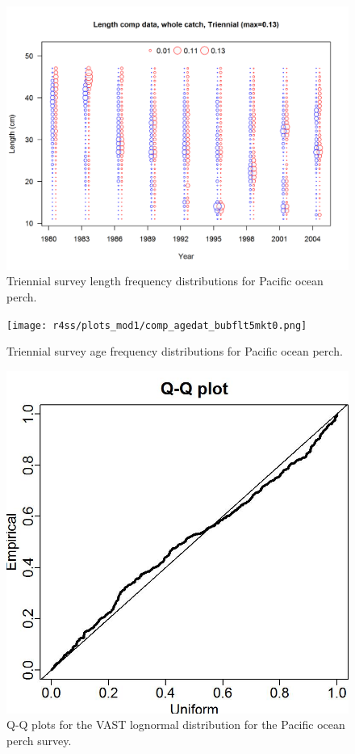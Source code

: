 \documentclass[12pt,]{article}
\begin{document}
\FloatBarrier

\begin{figure}
\centering
\includegraphics{r4ss/plots_mod1/comp_lendat_bubflt5mkt0.png}
\caption{Triennial survey length frequency distributions for Pacific
ocean perch. \label{fig:Tri_Length}}
\end{figure}

\FloatBarrier

\begin{figure}
\centering
\texttt{[image: r4ss/plots\_mod1/comp\_agedat\_bubflt5mkt0.png]}
\caption{Triennial survey age frequency distributions for Pacific ocean
perch. \label{fig:Tri_Age}}
\end{figure}

\FloatBarrier

\begin{figure}
\centering
\includegraphics{Figures/Q-Q_plot_pop.jpg}
\caption{Q-Q plots for the VAST lognormal distribution for the Pacific
ocean perch survey. \label{fig:pop_qq}}
\end{figure}
\end{document}

